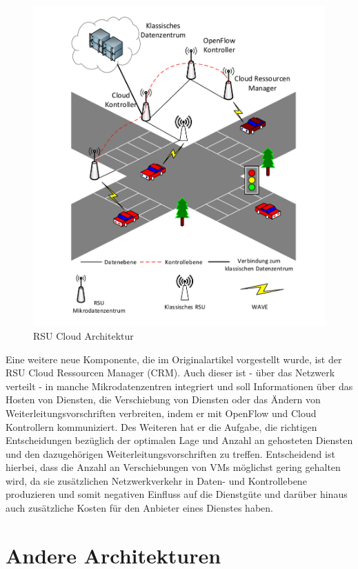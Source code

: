 \documentclass[conference]{IEEEtran}
\begin{document}
\begin{figure}[h!]
	\centering
	\includegraphics[trim=1.5cm 5 0 0.8cm, scale=0.66]{grafik/strasse.pdf}
	\caption{RSU Cloud Architektur}
	\label{img:grafik-dummy}
\end{figure}

Eine weitere neue Komponente, die im Originalartikel vorgestellt wurde, ist der RSU Cloud Ressourcen Manager (CRM). Auch dieser ist - über das Netzwerk verteilt - in manche Mikrodatenzentren integriert und soll Informationen über das Hosten von Diensten, die Verschiebung von Diensten oder das Ändern von Weiterleitungsvorschriften verbreiten, indem er mit OpenFlow und Cloud Kontrollern kommuniziert. Des Weiteren hat er die Aufgabe, die richtigen Entscheidungen bezüglich der optimalen Lage und Anzahl an gehosteten Diensten und den dazugehörigen Weiterleitungsvorschriften zu treffen. Entscheidend ist hierbei, dass die Anzahl an Verschiebungen von VMs möglichst gering gehalten wird, da sie zusätzlichen Netzwerkverkehr in Daten- und Kontrollebene produzieren und somit negativen Einfluss auf die Dienstgüte und darüber hinaus auch zusätzliche Kosten für den Anbieter eines Dienstes haben.



\section{Andere Architekturen}
\end{document}
